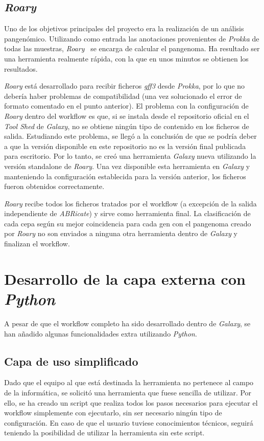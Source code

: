 \subsection{\itshape{Roary}}
Uno de los objetivos principales del proyecto era la realización de un análisis pangenómico. Utilizando como entrada las anotaciones provenientes de \textit{Prokka} de todas las muestras, \textit{Roary}~\cite{Page2015} se encarga de calcular el pangenoma. Ha resultado ser una herramienta realmente rápida, con la que en unos minutos se obtienen los resultados.

\textit{Roary} está desarrollado para recibir ficheros \textit{gff3} desde \textit{Prokka}, por lo que no debería haber problemas de compatibilidad (una vez solucionado el error de formato comentado en el punto anterior). El problema con la configuración de \textit{Roary} dentro del workflow es que, si se instala desde el repositorio oficial en el \textit{Tool Shed} de \textit{Galaxy}, no se obtiene ningún tipo de contenido en los ficheros de salida. Estudiando este problema, se llegó a la conclusión de que se podría deber a que la versión disponible en este repositorio no es la versión final publicada para escritorio. Por lo tanto, se creó una herramienta \textit{Galaxy} nueva utilizando la versión standalone de \textit{Roary}. Una vez disponible esta herramienta en \textit{Galaxy} y manteniendo la configuración establecida para la versión anterior, los ficheros fueron obtenidos correctamente.

\textit{Roary} recibe todos los ficheros tratados por el workflow (a excepción de la salida independiente de \textit{ABRicate}) y sirve como herramienta final. La clasificación de cada cepa según su mejor coincidencia para cada gen con el pangenoma creado por \textit{Roary} no son enviados a ninguna otra herramienta dentro de \textit{Galaxy} y finalizan el workflow.


\section{Desarrollo de la capa externa con \itshape{Python}}
A pesar de que el workflow completo ha sido desarrollado dentro de \textit{Galaxy}, se han añadido algunas funcionalidades extra utilizando \textit{Python}.

\subsection{Capa de uso simplificado}
Dado que el equipo al que está destinada la herramienta no pertenece al campo de la informática, se solicitó una herramienta que fuese sencilla de utilizar. Por ello, se ha creado un script que realiza todos los pasos necesarios para ejecutar el workflow simplemente con ejecutarlo, sin ser necesario ningún tipo de configuración. En caso de que el usuario tuviese conocimientos técnicos, seguirá teniendo la posibilidad de utilizar la herramienta sin este script.

